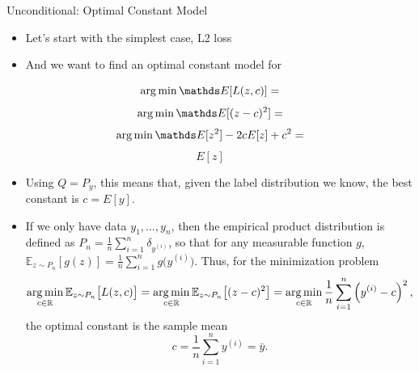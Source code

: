 \documentclass[11pt,compress,t,notes=noshow, xcolor=table]{beamer}
\begin{document}
\begin{vbframe}{Unconditional: Optimal Constant Model}

\begin{itemize}
\item Let's start with the simplest case, L2 loss
\item And we want to find an optimal constant model for 

\end{itemize}

$$ \argmin \E [L(z, c)] = $$
$$ \argmin \E [(z - c)^2] = $$
$$ \argmin \E [z^2] - 2cE[z] + c^2 = $$
$$ E[z] $$

\begin{itemize}
\item Using $Q = P_y$, this means that, given the label distribution we know,
the best constant is $c = E[y]$.
\item If we only have data \(y_1, \ldots, y_n\), then the empirical product distribution is defined as $P_n = \frac{1}{n}\sum_{i=1}^n \delta_{y^{(i)}}$, so that for any measurable function \(g\),
$\mathbb{E}_{z\sim P_n}[g(z)] = \frac{1}{n}\sum_{i=1}^n g\bigl(y^{(i)}\bigr).$
Thus, for the minimization problem
\[
 \mathop{\mathrm{arg\,min}}_{c \in \mathbb{R}} \mathbb{E}_{z\sim P_n}\bigl[L(z,c)\bigr] = \mathop{\mathrm{arg\,min}}_{c \in \mathbb{R}} \mathbb{E}_{z\sim P_n}\bigl[(z-c)^2\bigr] =  \mathop{\mathrm{arg\,min}}_{c \in \mathbb{R}} \frac{1}{n}\sum_{i=1}^n \left(y^{(i)}-c\right)^2,
\]
the optimal constant is the sample mean
\[
c = \frac{1}{n}\sum_{i=1}^n y^{(i)} = \bar{y}.
\]


\end{itemize}


\end{vbframe}
\end{document}
